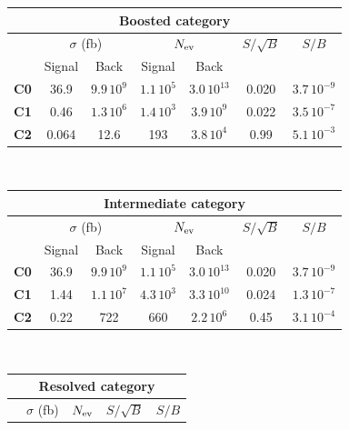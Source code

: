 \begin{table}[t]
  \centering
  \begin{tabular}{c|c|c||c|c||c|c}
    \hline
    \multicolumn{7}{c}{Boosted category}\\
    \hline
    \hline
    &    \multicolumn{2}{c||}{$\sigma$ (fb)}   &  \multicolumn{2}{c||}{$N_{\rm ev}$}
    &   $S/\sqrt{B}$  & $S/B$\\
      &    Signal & Back   &  Signal  & Back
    &   & \\
    \hline
        {\bf C0}  &  36.9  & $9.9\,10^{9}$ & $1.1\,10^5$ & $3.0\,10^{13}$  &  0.020 & $3.7\,10^{-9}$\\
        {\bf C1}  &  0.46    & $1.3\,10^6$    &  $1.4\,10^3$   & $3.9\,10^9$     & 0.022     &  $3.5\,10^{-7}$ \\
        {\bf C2}  &  0.064     &  12.6     &  193   &  $3.8\,10^4$    &  0.99    &  $5.1\,10^{-3}$ \\
        \hline
  \end{tabular}
  $\,$\\
  \vspace{0.4cm}
  \begin{tabular}{c|c|c|c|c|c|c}
    \hline
    \multicolumn{7}{c}{Intermediate category}\\
    \hline
    \hline
    &    \multicolumn{2}{c|}{$\sigma$ (fb)}   &  \multicolumn{2}{c|}{$N_{\rm ev}$}
    &   $S/\sqrt{B}$  & $S/B$\\
      &    Signal & Back   &  Signal  & Back
    &   & \\
    \hline
         {\bf C0}  &  36.9  & $9.9\,10^{9}$ & $1.1\,10^5$ & $3.0\,10^{13}$  &  0.020 & $3.7\,10^{-9}$\\
        {\bf C1}  &   1.44    &   $1.1\,10^{7}$  &  $4.3\,10^3$   &  $3.3\,10^{10}$    &  0.024    &  $1.3\,10^{-7}$ \\
        {\bf C2}  &   0.22    &  722   &  660   &   $2.2\,10^6$   &   0.45   &  $3.1\,10^{-4}$ \\
        \hline
  \end{tabular}
  $\,$\\
  \vspace{0.4cm}
  \noindent
  \begin{tabular}{c|c|c|c|c|c|c}
    \hline
    \multicolumn{7}{c}{Resolved category}\\
    \hline
    \hline
    &    \multicolumn{2}{c|}{$\sigma$ (fb)}   &  \multicolumn{2}{c|}{$N_{\rm ev}$}
    &   $S/\sqrt{B}$  & $S/B$\\

\end{tabular}
\end{table}
